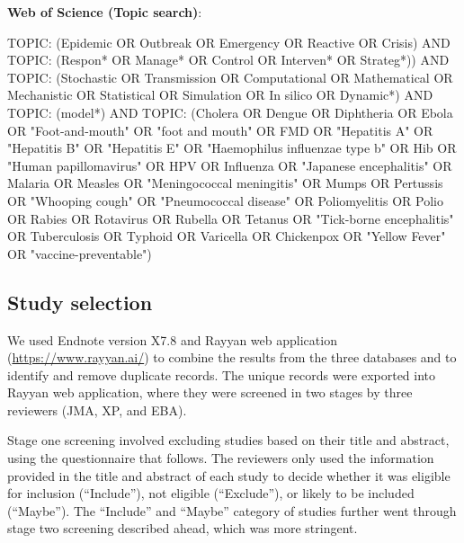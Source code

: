 \documentclass[10pt,letterpaper]{article}
\begin{document}
\textbf{Web of Science (Topic search)}:

TOPIC: (Epidemic OR Outbreak OR Emergency OR Reactive OR Crisis) AND TOPIC: (Respon* OR  Manage*  OR  Control  OR  Interven*  OR  Strateg*)) AND TOPIC: (Stochastic OR Transmission OR Computational OR Mathematical OR Mechanistic OR Statistical OR Simulation OR In silico OR Dynamic*) AND TOPIC: (model*) AND TOPIC: (Cholera OR Dengue OR Diphtheria OR Ebola OR "Foot-and-mouth" OR "foot and mouth" OR FMD OR "Hepatitis A" OR "Hepatitis B" OR "Hepatitis E" OR "Haemophilus influenzae type b" OR Hib OR "Human papillomavirus" OR HPV OR Influenza OR "Japanese encephalitis" OR Malaria OR Measles OR "Meningococcal meningitis" OR Mumps OR Pertussis OR "Whooping cough" OR "Pneumococcal disease" OR Poliomyelitis OR Polio OR Rabies OR Rotavirus OR Rubella OR Tetanus OR "Tick-borne encephalitis" OR Tuberculosis OR Typhoid OR Varicella OR Chickenpox OR "Yellow Fever" OR "vaccine-preventable")


\subsection*{Study selection}
We used Endnote version X7.8 and Rayyan web application (\url{https://www.rayyan.ai/}) to combine the results from the three databases and to identify and remove duplicate records. The unique records were exported into Rayyan web application, where they were screened in two stages by three reviewers (JMA, XP, and EBA). 

Stage one screening involved excluding studies based on their title and abstract, using the questionnaire that follows. The reviewers only used the information provided in the title and abstract of each study to decide whether it was eligible for inclusion (``Include''), not eligible (``Exclude''), or likely to be included (``Maybe''). The ``Include'' and ``Maybe'' category of studies further went through stage two screening described ahead, which was more stringent. 
\end{document}
